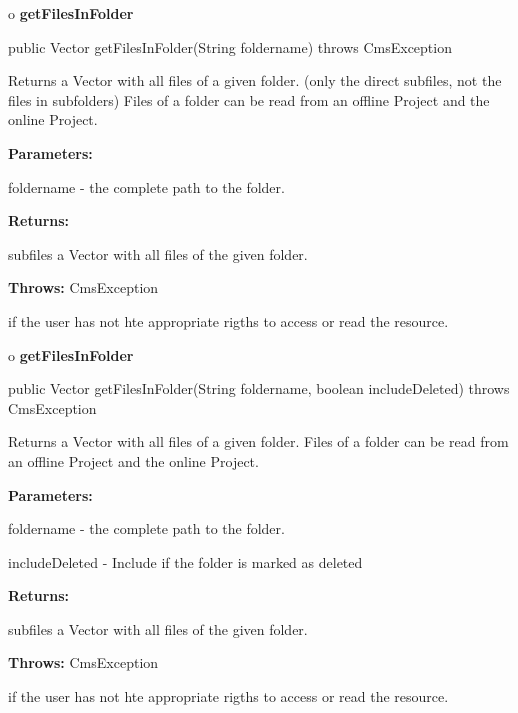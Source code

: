 o {\bf getFilesInFolder}

\begin{PRE}
 public Vector getFilesInFolder(String foldername) throws CmsException
\end{PRE}

\begin{description}
\htmlDD Returns a Vector with all files of a given folder. (only the direct
subfiles, not the files in subfolders) \htmlBR
Files of a folder can be read from an offline Project and the online Project.

\begin{description}
\item {\bf Parameters:}

foldername - the complete path to the folder.
\item {\bf Returns:}

subfiles a Vector with all files of the given folder.
\item {\bf Throws:} CmsException

if the user has not hte appropriate rigths to access or read the resource.
\end{description}

\end{description}

o {\bf getFilesInFolder}

\begin{PRE}
 public Vector getFilesInFolder(String foldername,
                                boolean includeDeleted) throws CmsException
\end{PRE}

\begin{description}
\htmlDD Returns a Vector with all files of a given folder. \htmlBR
Files of a folder can be read from an offline Project and the online Project.

\begin{description}
\item {\bf Parameters:}

foldername - the complete path to the folder.

includeDeleted - Include if the folder is marked as deleted
\item {\bf Returns:}

subfiles a Vector with all files of the given folder.
\item {\bf Throws:} CmsException

if the user has not hte appropriate rigths to access or read the resource.
\end{description}

\end{description}

